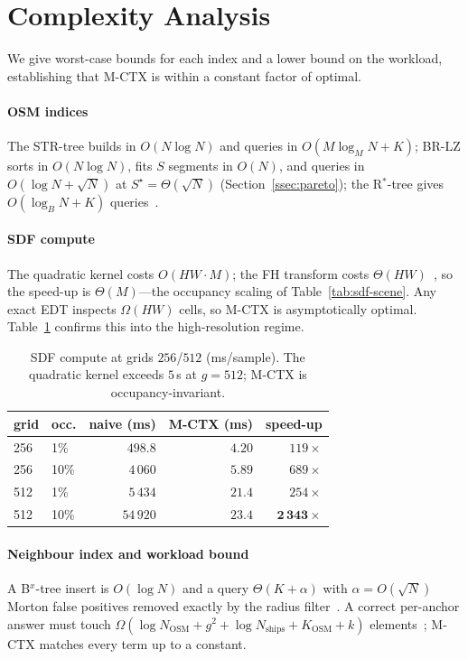 \section{Complexity Analysis}\label{app:theory}

We give worst-case bounds for each index and a lower bound on the
workload, establishing that M-CTX is within a constant factor of optimal.

\paragraph*{OSM indices}
The STR-tree builds in $O(N\log N)$ and queries in $O(M\log_M N+K)$;
BR-LZ sorts in $O(N\log N)$, fits $S$ segments in $O(N)$, and queries in
$O(\log N+\sqrt N)$ at $S^\star\!=\!\Theta(\sqrt N)$
(Section~\ref{ssec:pareto}); the R$^{*}$-tree gives $O(\log_B N+K)$
queries~\cite{beckmann1990rstar}.

\paragraph*{SDF compute}
The quadratic kernel costs $O(HW\!\cdot\!M)$; the FH transform costs
$\Theta(HW)$~\cite{felzenszwalb2004distance}, so the speed-up is
$\Theta(M)$---the occupancy scaling of Table~\ref{tab:sdf-scene}. Any
exact EDT inspects $\Omega(HW)$ cells, so M-CTX is asymptotically optimal.
Table~\ref{tab:sdf-extreme} confirms this into the high-resolution regime.

\begin{table}[t]
\centering
\caption{SDF compute at grids $256$/$512$ (ms/sample). The quadratic
kernel exceeds $5$\,s at $g{=}512$; M-CTX is
occupancy-invariant.}\label{tab:sdf-extreme}
\small
\begin{tabular}{llrrr}
\toprule
grid & occ. & naive (ms) & M-CTX (ms) & speed-up \\
\midrule
256 & 1\%  & $498.8$  & $4.20$ & $119\times$ \\
256 & 10\% & $4\,060$ & $5.89$ & $689\times$ \\
512 & 1\%  & $5\,434$ & $21.4$ & $254\times$ \\
512 & 10\% & $54\,920$& $23.4$ & $\mathbf{2\,343\times}$ \\
\bottomrule
\end{tabular}
\end{table}

\paragraph*{Neighbour index and workload bound}
A B$^{x}$-tree insert is $O(\log N)$ and a query $\Theta(K+\alpha)$ with
$\alpha\!=\!O(\sqrt N)$ Morton false positives removed exactly by the
radius filter~\cite{moon2001hilbert}. A correct per-anchor answer must
touch
$\Omega(\log N_{\mathrm{OSM}}+g^2+\log N_{\mathrm{ships}}+K_{\mathrm{OSM}}+k)$
elements~\cite{guibas1978fractional,vaidya1989optimal}; M-CTX matches
every term up to a constant.

